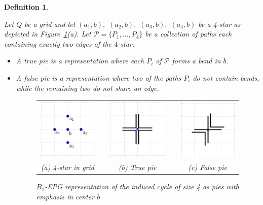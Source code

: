 \documentclass[
submission
]{dmtcs-episciences}
\newtheorem{definition}[theorem]{Definition}
\begin{document}
\begin{definition} \label{defi:tortasFrame}

Let $ Q $ be a grid and let $ (a_1, b),$ $(a_2, b),$ $(a_3, b),$ $(a_4, b)$ be a 4-star as depicted in Figure~\ref{fig:piesInGrid}(a). Let $ \mathcal{P} = \{P_1, \dots , P_4\}$ be a collection of paths each containing exactly two edges of the $4$-star:

\begin{itemize}
\item A \emph{true pie} is a representation where each $P_i$ of $ \mathcal{P} $ forms a bend in $b$.

\item A \emph {false pie} is a representation where two of the paths $P_i$ do not contain bends, while the remaining two do not share an edge. 

%
\begin{figure}[htb]
  \centering
  \begin{tabular}{c c c c c }
    \includegraphics[width=3.5cm]{disposicaoTortaGrid3}    
    & &\includegraphics[width=3.5cm]{truePieGrid} 
    & &
 \includegraphics[width=3.5cm]{falsePieGrid} \\%
    {\footnotesize (a) 4-star in grid}  & &  {\footnotesize (b) True pie} & & {\footnotesize (c) False pie} %
  \end{tabular}
  \caption{$B_{1}$-EPG representation of the induced cycle of size 4 as pies with emphasis in center $b$}\label{fig:piesInGrid}
\end{figure} 

\end{itemize}
\end{definition}
\end{document}
